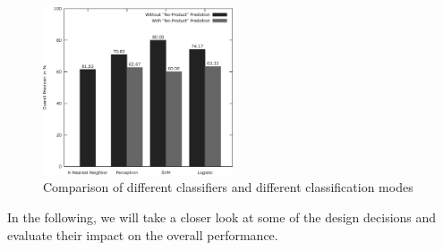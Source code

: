 \begin{figure}
	\begin{center}
		\includegraphics[width=0.5\textwidth]{figures/product_eval.eps}
	\end{center}
	\caption{Comparison of different classifiers and different classification modes}
	\label{fig:product_eval}
\end{figure}

In the following, we will take a closer look at some of the design decisions and evaluate their impact on the overall performance.

